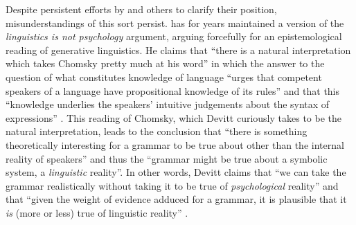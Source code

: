 Despite persistent efforts by \citet{Chomsky1975,Chomsky1995,Chomsky2000,Chomsky2016} and others to clarify their position, misunderstandings of this sort persist. \citet{Devitt2003,Devitt2006,Devitt2006a} has for years maintained a version of the \textit{linguistics is not psychology} argument, arguing forcefully for an epistemological reading of generative linguistics. He claims that “there is a natural interpretation which takes Chomsky pretty much at his word” in which the answer to the  question of what constitutes knowledge of language “urges that competent speakers of a language have propositional knowledge of its rules” and that this “knowledge underlies the speakers’ intuitive judgements about the syntax of expressions” \citep[107--108]{Devitt2003}. This reading of Chomsky, which Devitt curiously takes to be the natural interpretation, leads to the conclusion that “there is something theoretically interesting for a grammar to be true about other than the internal reality of speakers” and thus the “grammar might be true about a symbolic system, a \textit{linguistic} reality”. In other words, Devitt claims that “we can take the grammar realistically without taking it to be true of \textit{psychological} reality” and that “given the weight of evidence adduced for a grammar, it is plausible that it \textit{is} (more or less) true of linguistic reality” \citep[131, emphasis in original]{Devitt2003}.

